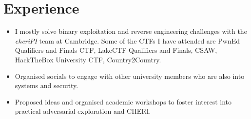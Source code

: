 \documentclass{resume}
\begin{document}

\section{Experience}

\begin{itemize}
  \item I mostly solve binary exploitation and reverse engineering challenges with the \textit{cheriPI} team at Cambridge. Some of the CTFs I have attended are PwnEd Qualifiers and Finals CTF, LakeCTF Qualifiers and Finals, CSAW, HackTheBox University CTF, Country2Country.
\end{itemize}

\begin{itemize}
  \item Organised socials to engage with other university members who are also into systems and security.
  \item Proposed ideas and organised academic workshops to foster interest into practical adversarial exploration and CHERI.
\end{itemize}



\end{document}

